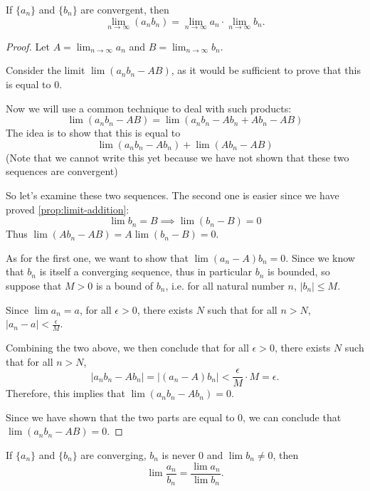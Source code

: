 \begin{proposition}
If $\{a_n\}$ and $\{b_n\}$ are convergent, then
\begin{equation}
\lim_{n\to\infty}(a_n b_n)=\lim_{n\to\infty}a_n\cdot\lim_{n\to\infty}b_n.
\end{equation}
\end{proposition}

\begin{proof}
Let $A=\lim_{n\to\infty}a_n$ and $B=\lim_{n\to\infty}b_n$.

Consider the limit $\lim(a_nb_n-AB)$, as it would be sufficient to prove that this is equal to $0$.

Now we will use a common technique to deal with such products:
\[ \lim(a_nb_n-AB)=\lim(a_nb_n-Ab_n+Ab_n-AB) \]
The idea is to show that this is equal to
\[ \lim(a_nb_n-Ab_n)+\lim(Ab_n-AB) \]
(Note that we cannot write this yet because we have not shown that these two sequences are convergent)

So let's examine these two sequences. The second one is easier since we have proved \cref{prop:limit-addition}:
\[ \lim b_n=B \implies \lim(b_n-B)=0 \]
Thus $\lim(Ab_n-AB)=A\lim(b_n-B)=0$.

As for the first one, we want to show that $\lim(a_n-A)b_n=0$. Since we know that $b_n$ is itself a converging sequence, thus in particular $b_n$ is bounded, so suppose that $M>0$ is a bound of $b_n$, i.e. for all natural number $n$, $|b_n|\le M$.

Since $\lim a_n=a$, for all $\epsilon>0$, there exists $N$ such that for all $n>N$, $|a_n-a|<\frac{\epsilon}{M}$.

Combining the two above, we then conclude that for all $\epsilon>0$, there exists $N$ such that for all $n>N$,
\[ |a_nb_n-Ab_n|=|(a_n-A)b_n|<\frac{\epsilon}{M}\cdot M=\epsilon. \]
Therefore, this implies that $\lim(a_nb_n-Ab_n)=0$.

Since we have shown that the two parts are equal to $0$, we can conclude that $\lim(a_nb_n-AB)=0$.
\end{proof}

\begin{proposition}
If $\{a_n\}$ and $\{b_n\}$ are converging, $b_n$ is never $0$ and $\lim b_n \neq 0$, then \[ \lim\frac{a_n}{b_n}=\frac{\lim a_n}{\lim b_n}. \]
\end{proposition}

